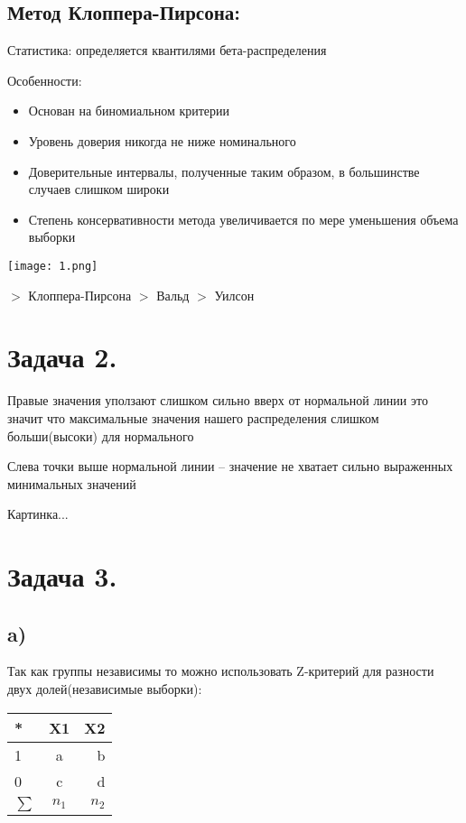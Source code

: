 \documentclass[10pt,reqno]{amsart}
\theoremstyle{definition}
\theoremstyle{remark}
\begin{document}
\subsection*{Метод Клоппера-Пирсона:}

Статистика: определяется квантилями бета-распределения

Особенности:
\begin{itemize}
\item Основан на биномиальном критерии
\item Уровень доверия никогда не ниже номинального
\item Доверительные интервалы, полученные таким образом, в большинстве случаев слишком широки
\item Степень консервативности метода увеличивается по мере уменьшения объема выборки
\end{itemize}

\texttt{[image: 1.png]}


$>$ Клоппера-Пирсона
$>$ Вальд
$>$ Уилсон

\section*{Задача 2.}

Правые значения уползают слишком сильно вверх от нормальной линии это значит что максимальные значения нашего распределения слишком больши(высоки) для нормального

Слева точки выше нормальной линии -- значение не хватает сильно выраженных минимальных значений


Картинка...

\section*{Задача 3.}
\subsection*{a)}

Так как группы независимы то можно использовать Z-критерий для разности двух долей(независимые выборки):

\begin{tabular}{| l | c | r |}
        \hline
        * & X1 & X2 \\
        \hline
        1 & a & b \\
        \hline
        0 & c & d \\
        \hline
        $\sum$ & $n_1$ & $n_2$ \\
        \hline
\end{tabular}
\end{document}
